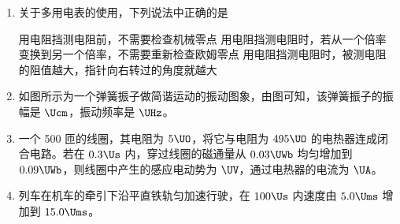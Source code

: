 \documentclass[\gkver]{gaokaozhenti}
\begin{document}
\begin{enumerate}
{光的衍射}
{光的干涉}
{光的全反射}


\item
关于多用电表的使用，下列说法中正确的是

{用电阻挡测电阻前，不需要检查机械零点}
{用电阻挡测电阻时，若从一个倍率变换到另一个倍率，不需要重新检查欧姆零点}
{用电阻挡测电阻时，被测电阻的阻值越大，指针向右转过的角度就越大}


\item
如图所示为一个弹簧振子做简谐运动的振动图象，由图可知，该弹簧振子的振幅是 $\Ucm$，振动频率是 $\UHz$。



\item
一个 500 匝的线圈，其电阻为 $5\UO$，将它与电阻为 $495\UO$ 的电热器连成闭合电路。若在 $0.3\Us$ 内，穿过线圈的磁通量从 $0.03\UWb$ 均匀增加到 $0.09\UWb$，则线圈中产生的感应电动势为 $\UV$，通过电热器的电流为 $\UA$。



\item
列车在机车的牵引下沿平直铁轨匀加速行驶，在 $100\Us$ 内速度由 $5.0\Ums$ 增加到 $15.0\Ums$。


\end{enumerate}
\end{document}
